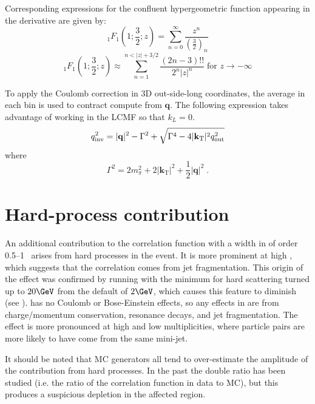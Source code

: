 Corresponding expressions for the confluent hypergeometric function appearing in the derivative are given by:
\begin{equation}
 {}_1F_1 \left( 1;\frac{3}{2}; z \right) = \sum_{n=0}^{\infty} \frac{z^n}{\left(\frac{3}{2}\right)_n} 
\end{equation}
\begin{equation}
  {}_1F_1 \left( 1; \frac{3}{2}; z \right) \approx \sum_{n=1}^{n < |z| + 3/2} \frac{(2n-3)!!}{2^n |z|^n} \; \textrm{for } z \rightarrow -\infty
\end{equation}

To apply the Coulomb correction in 3D out-side-long coordinates, the average \kt in each bin is used to contract compute \qinv from $\mathbf{q}$.
The following expression takes advantage of working in the \ac{LCMF} so that $k_L = 0$.
\begin{equation}
q_{\mathrm{inv}}^2 = |\mathbf{q}|^2 - \Gamma^2 + \sqrt{\Gamma^4 - 4 |\mathbf{k}_\mathrm{T}|^2 q_{\mathrm{out}}^2} \label{eqn:q3_to_qinv}
\end{equation}
where
\begin{equation}
\Gamma^2 = 2 m_{\pi}^2 + 2 |\mathbf{k}_\mathrm{T}|^2 + \frac{1}{2}|\mathbf{q}|^2 \; .
\end{equation}

\FloatBarrier
\section{Hard-process contribution}
\label{sec:jet_frag}

An additional contribution to the correlation function with a width in \qinv of order 0.5--1 \GeV\ arises from hard processes in the event.
It is more prominent at high \kt, which suggests that the correlation comes from jet fragmentation.
This origin of the effect was confirmed by running \Hijing with the minimum \pt for hard scattering turned up to $20 \GeV$ from the default of $2 \GeV$, which causes this feature to diminish (see ).
\Hijing has no Coulomb or Bose-Einstein effects, so any effects in  are from charge/momentum conservation, resonance decays, and jet fragmentation.
The effect is more pronounced at high \kt and low multiplicities, where particle pairs are more likely to have come from the same mini-jet.

It should be noted that MC generators all tend to over-estimate the amplitude of the contribution from hard processes.
In the past the double ratio has been studied (i.e. the ratio of the correlation function in data to MC), but this produces a suspicious depletion in the affected \qinv region.


